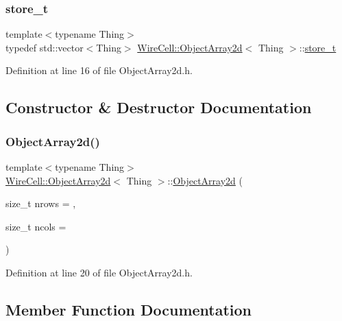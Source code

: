 \subsubsection{\texorpdfstring{store\+\_\+t}{store\_t}}
{\footnotesize\ttfamily template$<$typename Thing$>$ \\
typedef std\+::vector$<$Thing$>$ \hyperlink{class_wire_cell_1_1_object_array2d}{Wire\+Cell\+::\+Object\+Array2d}$<$ Thing $>$\+::\hyperlink{class_wire_cell_1_1_object_array2d_af40c546ff8c0417e73454fe88360d690}{store\+\_\+t}}



Definition at line 16 of file Object\+Array2d.\+h.



\subsection{Constructor \& Destructor Documentation}
\mbox{\label{class_wire_cell_1_1_object_array2d_a4fa3cec6f7d93ab392464dff04b1061e}} 
\subsubsection{\texorpdfstring{Object\+Array2d()}{ObjectArray2d()}}
{\footnotesize\ttfamily template$<$typename Thing$>$ \\
\hyperlink{class_wire_cell_1_1_object_array2d}{Wire\+Cell\+::\+Object\+Array2d}$<$ Thing $>$\+::\hyperlink{class_wire_cell_1_1_object_array2d}{Object\+Array2d} (\begin{DoxyParamCaption}\item[{size\+\_\+t}]{nrows = {},  }\item[{size\+\_\+t}]{ncols = {} }\end{DoxyParamCaption})\hspace{0.3cm}{\ttfamily [inline]}}



Definition at line 20 of file Object\+Array2d.\+h.



\subsection{Member Function Documentation}
\mbox{\label{class_wire_cell_1_1_object_array2d_a76ff38c108ab3a9b1678c1a3ccca8404}} 
